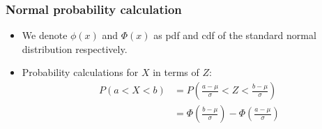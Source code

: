 \documentclass[slidestop,compress,mathserif]{beamer}
\begin{document}
\begin{frame}\frametitle{Normal probability calculation}
\begin{itemize}


\item We denote $\phi(x)$ and $\Phi(x)$ as pdf and cdf of the standard normal distribution respectively.

\item Probability calculations for $X$ in terms of $Z$:
\begin{align*}
P(a < X < b) %
&= P\left(\frac{a - \mu}{\sigma} < Z < \frac{b - \mu}{\sigma}\right) \\
& = \Phi\left(\frac{b - \mu}{\sigma}\right) - \Phi\left(\frac{a - \mu}{\sigma}\right)
\end{align*}


\end{itemize}
\end{frame}


\end{document}
